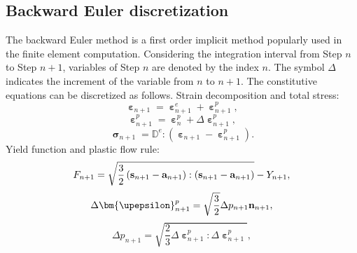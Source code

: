 \subsection{Backward Euler discretization}
The backward Euler method is a first order implicit method popularly used in the finite element computation. Considering the integration interval from Step $n$ to Step $n+1$, variables of Step $n$ are denoted by the index $n$. The symbol $\Delta$ indicates the increment of the variable from $n$ to $n+1$. The constitutive equations can be discretized as follows.
Strain decomposition and total stress:
\begin{equation}
{{\bm{\upepsilon }}_{n + 1}} = {\bm{\upepsilon }}_{n + 1}^e + {\bm{\upepsilon }}_{n + 1}^p,
\end{equation}
\begin{equation}
{\bm{\upepsilon }}_{n + 1}^p = {\bm{\upepsilon }}_n^p + \Delta {\bm{\upepsilon }}_{n + 1}^p,
\end{equation}
\begin{equation}
\label{Equ:sigman+1}
{{\bm{\upsigma }}_{n + 1}} = {\mathbb{D}^e}:\left( {{{\bm{\upepsilon }}_{n + 1}} - {\bm{\upepsilon }}_{n + 1}^p} \right).
\end{equation}
Yield function and plastic flow rule:
\begin{equation}
\label{Equ:Fn+1}
{F_{n + 1}} = \sqrt {\frac{3}{2}\left( {{{\bf{s}}_{n + 1}} - {{\bf{a}}_{n + 1}}} \right):\left( {{{\bf{s}}_{n + 1}} - {{\bf{a}}_{n + 1}}} \right)}  - {Y_{n + 1}},
\end{equation}
\begin{equation}
\label{Equ:epsilonpn+1}
\Delta {\bm{\upepsilon }}_{n + 1}^p = \sqrt {\frac{3}{2}} \Delta {p_{n + 1}}{{\bf{n}}_{n + 1}},
\end{equation}
\begin{equation}
\label{Equ:pn+1}
\Delta {p_{n + 1}} = \sqrt {\frac{2}{3}\Delta {\bm{\upepsilon }}_{n + 1}^p:\Delta {\bm{\upepsilon }}_{n + 1}^p},
\end{equation}
